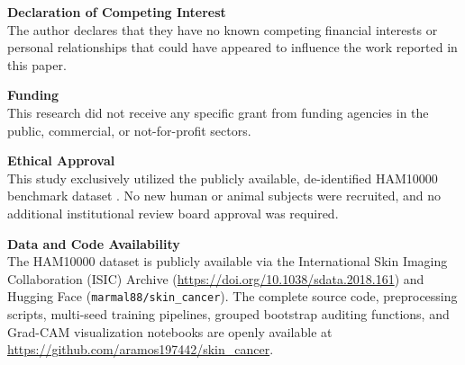 \documentclass[11pt,a4paper]{article}
\begin{document}
\vspace{0.4em}
\noindent\textbf{Declaration of Competing Interest}\\
The author declares that they have no known competing financial interests or personal relationships that could have appeared to influence the work reported in this paper.

\vspace{0.4em}
\noindent\textbf{Funding}\\
This research did not receive any specific grant from funding agencies in the public, commercial, or not-for-profit sectors.

\vspace{0.4em}
\noindent\textbf{Ethical Approval}\\
This study exclusively utilized the publicly available, de-identified HAM10000 benchmark dataset \cite{tschandl2018}. No new human or animal subjects were recruited, and no additional institutional review board approval was required.

\vspace{0.4em}
\noindent\textbf{Data and Code Availability}\\
The HAM10000 dataset is publicly available via the International Skin Imaging Collaboration (ISIC) Archive (\url{https://doi.org/10.1038/sdata.2018.161}) and Hugging Face (\texttt{marmal88/skin\_cancer}). The complete source code, preprocessing scripts, multi-seed training pipelines, grouped bootstrap auditing functions, and Grad-CAM visualization notebooks are openly available at \url{https://github.com/aramos197442/skin_cancer}.
\end{document}
